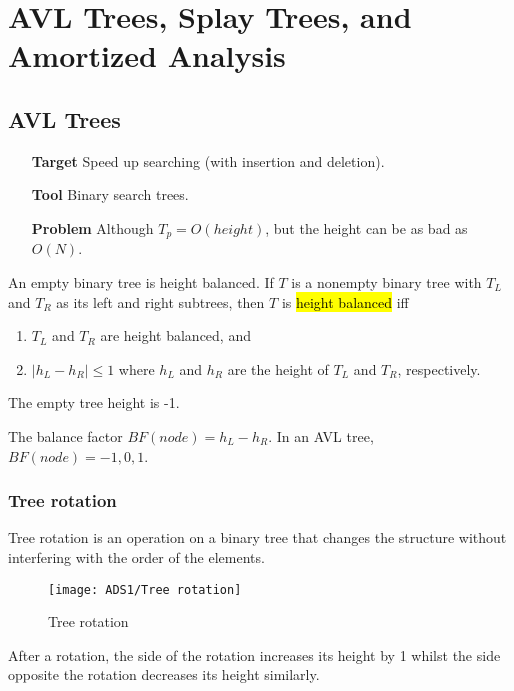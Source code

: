 \newpage
\section{AVL Trees, Splay Trees, and Amortized Analysis}

\subsection{AVL Trees}
\begin{itemize}
    \item [\textbf{Target}] Speed up searching (with insertion and deletion). 
    \item [\textbf{Tool}] Binary search trees. 
    \item [\textbf{Problem}] Although $T_p=O(height)$, but the height can be as bad as $O(N)$. 
\end{itemize}

\begin{definition}
    An empty binary tree is height balanced. If $T$ is a nonempty binary tree with $T_L$ and $T_R$ as its left and right subtrees, then $T$ is \hl{height balanced} iff 
    \begin{enumerate}
        \item $T_L$ and $T_R$ are height balanced, and 
        \item $|h_L -h_R|\le 1$ where $h_L$ and $h_R$ are the height of $T_L$ and $T_R$, respectively. 
    \end{enumerate}
\end{definition}
The empty tree height is -1. 

\begin{definition}
    The balance factor $BF(node)=h_L -h_R$. In an AVL tree, $BF(node)=-1,0,1$.
\end{definition}

\subsubsection{Tree rotation}
Tree rotation is an operation on a binary tree that changes the structure without interfering with the order of the elements. 

\begin{figure}[H]
    \centering
    \texttt{[image: ADS1/Tree rotation]}
    \caption{Tree rotation}
\end{figure}

After a rotation, the side of the rotation increases its height by 1 whilst the side opposite the rotation decreases its height similarly. 

